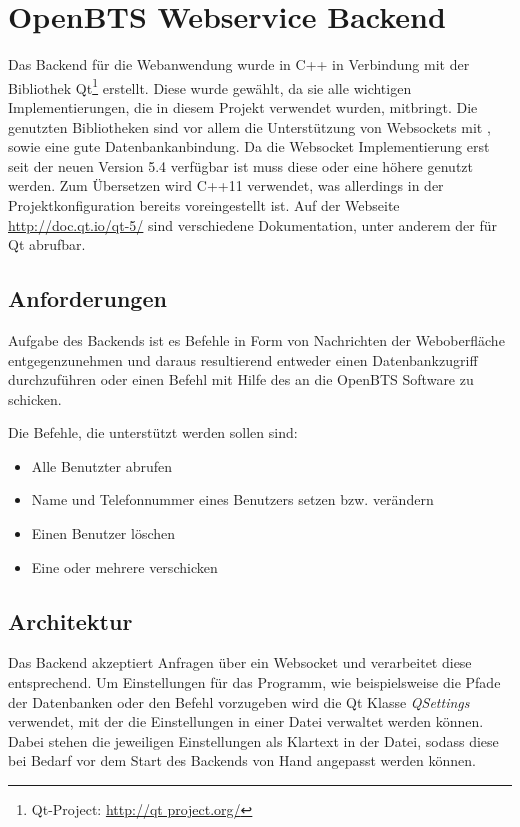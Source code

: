 \section{OpenBTS Webservice Backend}

Das Backend für die Webanwendung wurde in C++ in Verbindung mit der Bibliothek Qt\footnote{Qt-Project: \url{http://qt project.org/}} erstellt. Diese wurde gewählt, da sie alle wichtigen Implementierungen, die in diesem Projekt verwendet wurden, mitbringt. Die genutzten Bibliotheken sind vor allem die Unterstützung von Websockets mit \JSON, sowie eine gute Datenbankanbindung. Da die Websocket Implementierung erst seit der neuen Version 5.4 verfügbar ist muss diese oder eine höhere genutzt werden. Zum Übersetzen wird C++11 verwendet, was allerdings in der Projektkonfiguration bereits voreingestellt ist. Auf der Webseite \url{http://doc.qt.io/qt-5/} sind verschiedene Dokumentation, unter anderem der \API für Qt abrufbar.

\subsection{Anforderungen}

Aufgabe des Backends ist es Befehle in Form von \JSON Nachrichten der Weboberfläche entgegenzunehmen und daraus resultierend entweder einen Datenbankzugriff durchzuführen oder einen Befehl mit Hilfe des \CLI an die OpenBTS Software zu schicken.

Die Befehle, die unterstützt werden sollen sind:

\begin{itemize}
	\item Alle Benutzter abrufen
	\item Name und Telefonnummer eines Benutzers setzen bzw. verändern
	\item Einen Benutzer löschen
	\item Eine oder mehrere \SMS verschicken
\end{itemize}

\subsection{Architektur}

Das Backend akzeptiert \JSON Anfragen über ein Websocket und verarbeitet diese entsprechend. Um Einstellungen für das Programm, wie beispielsweise die Pfade der Datenbanken oder den \SMS Befehl vorzugeben wird die Qt Klasse \textit{QSettings} verwendet, mit der die Einstellungen in einer Datei verwaltet werden können. Dabei stehen die jeweiligen Einstellungen als Klartext in der Datei, sodass diese bei Bedarf vor dem Start des Backends von Hand angepasst werden können.

